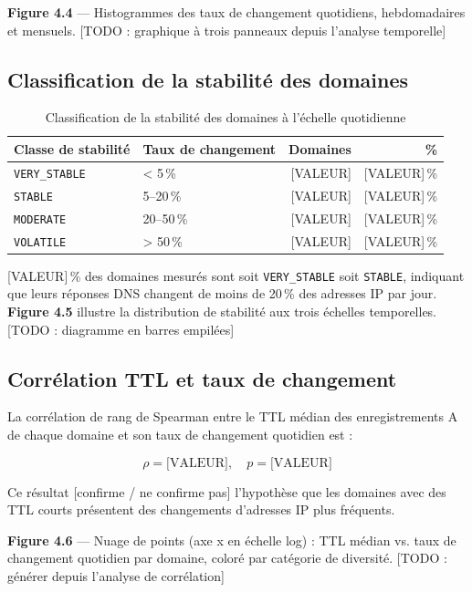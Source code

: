 \textbf{Figure 4.4} --- Histogrammes des taux de changement quotidiens, hebdomadaires et mensuels. [TODO : graphique à trois panneaux depuis l'analyse temporelle]

\subsection{Classification de la stabilité des domaines}
\label{subsec:4.3.2}

\begin{table}[H]
\centering
\small
\begin{tabularx}{\linewidth}{l l r r}
\toprule
\textbf{Classe de stabilité} & \textbf{Taux de changement} & \textbf{Domaines} & \textbf{\%} \\
\midrule
\texttt{VERY\_STABLE} & < 5\,\% & [VALEUR] & [VALEUR]\,\% \\
\texttt{STABLE} & 5--20\,\% & [VALEUR] & [VALEUR]\,\% \\
\texttt{MODERATE} & 20--50\,\% & [VALEUR] & [VALEUR]\,\% \\
\texttt{VOLATILE} & > 50\,\% & [VALEUR] & [VALEUR]\,\% \\
\bottomrule
\end{tabularx}
\caption{Classification de la stabilité des domaines à l'échelle quotidienne}
\label{tab:stability_classes}
\end{table}

[VALEUR]\,\% des domaines mesurés sont soit \texttt{VERY\_STABLE} soit \texttt{STABLE}, indiquant que leurs réponses DNS changent de moins de 20\,\% des adresses IP par jour. \textbf{Figure 4.5} illustre la distribution de stabilité aux trois échelles temporelles. [TODO : diagramme en barres empilées]

\subsection{Corrélation TTL et taux de changement}
\label{subsec:4.3.3}

La corrélation de rang de Spearman entre le TTL médian des enregistrements A de chaque domaine et son taux de changement quotidien est :

\[
\rho = \text{[VALEUR]}, \quad p = \text{[VALEUR]}
\]

Ce résultat [confirme / ne confirme pas] l'hypothèse que les domaines avec des TTL courts présentent des changements d'adresses IP plus fréquents.

\textbf{Figure 4.6} --- Nuage de points (axe x en échelle log) : TTL médian vs. taux de changement quotidien par domaine, coloré par catégorie de diversité. [TODO : générer depuis l'analyse de corrélation]


